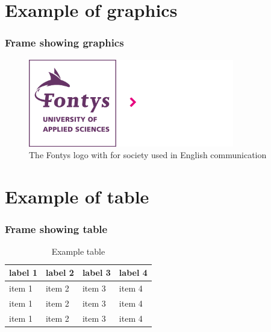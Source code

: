 \documentclass[aspectratio=169]{beamer}
\begin{document}
\section{Example of graphics}
\begin{frame}
    \frametitle{Frame showing graphics}
    
    \begin{figure}
        \centering
        \includegraphics[width=0.8\textwidth]{logo_purple_society_en.png}
        \caption{The Fontys logo with for society used in English communication}
        \label{fig:logo}
    \end{figure}

\end{frame}

\section{Example of table}
\begin{frame}
    \frametitle{Frame showing table}

    \begin{table}
        \begin{tabularx}{\textwidth}{ |X|X|X|X| }
            \hline
            label 1 & label 2 & label 3 & label 4 \\
            \hline 
            item 1  & item 2  & item 3  & item 4  \\
            \hline 
            item 1  & item 2  & item 3  & item 4  \\
            \hline 
            item 1  & item 2  & item 3  & item 4  \\
            \hline
          \end{tabularx}
          \caption{Example table}
    \end{table}

\end{frame}
\end{document}
